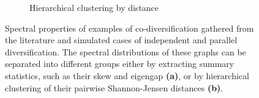 \begin{figure}
\begin{subfigure}[b]{0.5\textwidth}
        \caption{Hierarchical clustering by distance}
    \end{subfigure}
    \caption{Spectral properties of examples of co-diversification gathered from the literature and simulated cases of independent and parallel diversification. The spectral distributions of these graphs can be separated into different groups either by extracting summary statistics, such as their skew and eigengap \textbf{(a)}, or by hierarchical clustering of their pairwise Shannon-Jensen distances \textbf{(b)}.}
    \label{fig:FP_codivlit}
\end{figure}